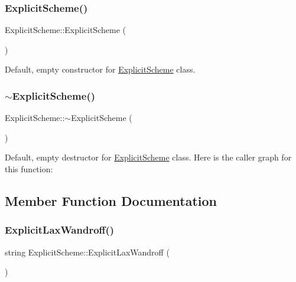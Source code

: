 \subsubsection{\texorpdfstring{Explicit\+Scheme()}{ExplicitScheme()}}
{\footnotesize\ttfamily Explicit\+Scheme\+::\+Explicit\+Scheme (\begin{DoxyParamCaption}{ }\end{DoxyParamCaption})}

Default, empty constructor for \mbox{\hyperlink{class_explicit_scheme}{Explicit\+Scheme}} class. \mbox{\label{class_explicit_scheme_a5eee023f6f9d09609066a50dd620b49a}} 
\subsubsection{\texorpdfstring{$\sim$\+Explicit\+Scheme()}{~ExplicitScheme()}}
{\footnotesize\ttfamily Explicit\+Scheme\+::$\sim$\+Explicit\+Scheme (\begin{DoxyParamCaption}{ }\end{DoxyParamCaption})}

Default, empty destructor for \mbox{\hyperlink{class_explicit_scheme}{Explicit\+Scheme}} class. Here is the caller graph for this function\+:


\subsection{Member Function Documentation}
\mbox{\label{class_explicit_scheme_a2698e08e62763c56b972b478d665c34c}} 
\subsubsection{\texorpdfstring{Explicit\+Lax\+Wandroff()}{ExplicitLaxWandroff()}}
{\footnotesize\ttfamily string Explicit\+Scheme\+::\+Explicit\+Lax\+Wandroff (\begin{DoxyParamCaption}{ }\end{DoxyParamCaption})}

